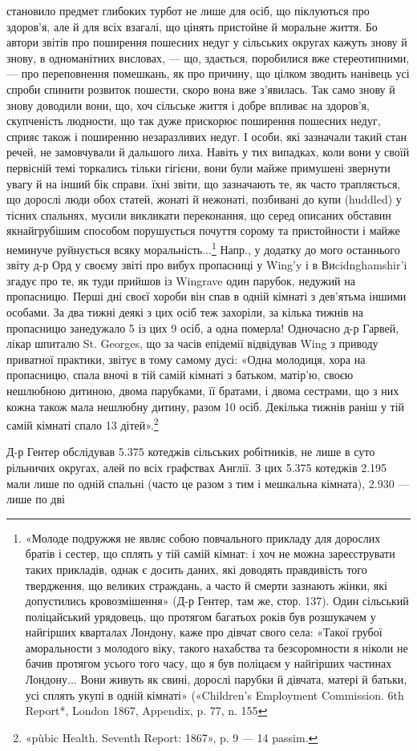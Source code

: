 \parcont{}  %
становило предмет глибоких турбот не лише для осіб, що піклуються
про здоров’я, але й для всіх взагалі, що цінять пристойне
й моральне життя. Бо автори звітів про поширення пошесних
недуг у сільських округах кажуть знову й знову, в одноманітних
висловах, — що, здається, поробилися вже стереотипними, — про
переповнення помешкань, як про причину, що цілком зводить
нанівець усі спроби спинити розвиток пошести, скоро вона вже
з’явилась. Так само знову й знову доводили вони, що, хоч сільське
життя і добре впливає на здоров’я, скупченість людности,
що так дуже прискорює поширення пошесних недуг, сприяє
також і поширенню незаразливих недуг. І особи, які зазначали
такий стан речей, не замовчували й дальшого лиха. Навіть у тих
випадках, коли вони у своїй первісній темі торкались тільки
гігієни, вони були майже примушені звернути увагу й на інший
бік справи. їхні звіти, що зазначають те, як часто трапляється, що
дорослі люди обох статей, жонаті й нежонаті, позбивані до купи
(huddled) у тісних спальнях, мусили викликати переконання,
що серед описаних обставин якнайгрубішим способом порушується
почуття сорому та пристойности і майже неминуче руйнується
всяку моральність...\footnote{
«Молоде подружжя не являє собою повчального прикладу для
дорослих братів і сестер, що сплять у тій самій кімнат: і хоч не можна
зареєструвати таких прикладів, однак є досить даних, які доводять правдивість
того твердження, що великих страждань, а часто й смерти зазнають
жінки, які допустились кровозмішення» (Д-р Гентер, там же, стор. 137).
Один сільський поліцайський урядовець, що протягом багатьох років
був розшукачем у найгірших кварталах Лондону, каже про дівчат свого
села: «Такої грубої аморальности з молодого віку, такого нахабства
та безсоромности я ніколи не бачив протягом усього того часу, що я був
поліцаєм у найгірших частинах Лондону... Вони живуть як свині, дорослі
парубки й дівчата, матері й батьки, усі сплять укупі в одній кімнаті»
(«Children’s Employment Commission. 6th Report*, London 1867, Appendix,
p. 77, n. 155
} Напр., у додатку до мого останнього звіту
д-р Орд у своєму звіті про вибух пропасниці у Wing’y і в Виcidnghamshir’i
згадує про те, як туди прийшов із Wingrave один
парубок, недужий на пропасницю. Перші дні своєї хороби він
спав в одній кімнаті з дев’ятьма іншими особами. За два тижні
деякі з цих осіб теж захоріли, за кілька тижнів на пропасницю
занедужало 5 із цих 9 осіб, а одна померла! Одночасно
д-р Гарвей, лікар шпиталю St. Georges, що за часів епідемії відвідував
Wing з приводу приватної практики, звітує в тому самому
дусі: «Одна молодиця, хора на пропасницю, спала вночі
в тій самій кімнаті з батьком, матір’ю, своєю нешлюбною дитиною,
двома парубками, її братами, і двома сестрами, що з них
кожна також мала нешлюбну дитину, разом 10 осіб. Декілька
тижнів раніш у тій самій кімнаті спало 13 дітей».\footnote{
«pùbic Health. Seventh Report: 1867», p. 9 — 14 passim.
}

Д-р Гентер обслідував 5.375 котеджів сільських робітників,
не лише в суто рільничих округах, алей по всіх графствах
Англії. З цих 5.375 котеджів 2.195 мали лише по одній спальні
(часто це разом з тим і мешкальна кімната), 2.930 — лише по дві
\parbreak{}  %
